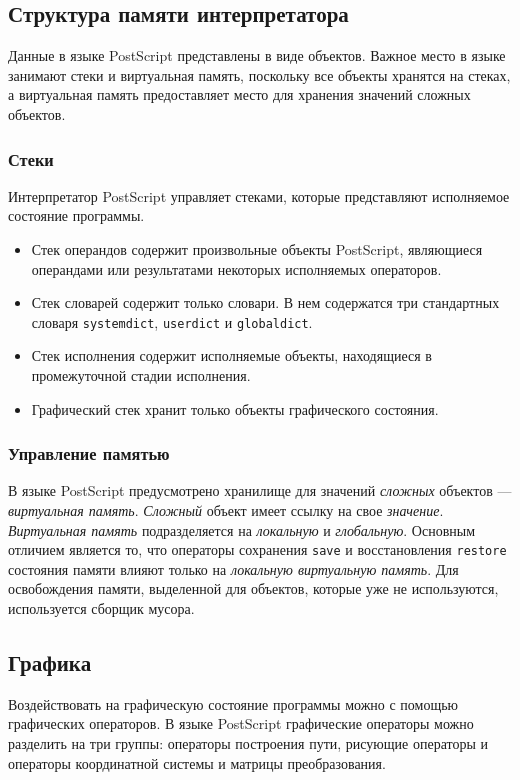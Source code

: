 \documentclass[14pt]{extarticle}
\begin{document}
\subsection{Структура памяти интерпретатора}
Данные в языке PostScript представлены в виде объектов. Важное место в языке занимают стеки и виртуальная память, поскольку все объекты хранятся на стеках, а виртуальная память предоставляет место для хранения значений сложных объектов.
\subsubsection{Стеки }
Интерпретатор PostScript управляет стеками, которые представляют исполняемое состояние программы. 
\begin{itemize}
\item Стек операндов содержит произвольные объекты PostScript, являющиеся операндами или результатами некоторых исполняемых операторов.
\item Стек словарей содержит только словари. В нем содержатся три стандартных словаря \texttt{systemdict}, \texttt{userdict} и \texttt{globaldict}.
\item Стек исполнения содержит исполняемые объекты, находящиеся в промежуточной стадии исполнения.
\item Графический стек хранит только объекты графического состояния.
\end{itemize}

\subsubsection{Управление памятью}
В языке PostScript предусмотрено хранилище для значений \textit{сложных} объектов --- \textit{виртуальная память}. \textit{Сложный} объект имеет ссылку на свое \textit{значение}. \textit{Виртуальная память} подразделяется на \textit{локальную} и \textit{глобальную}.
Основным отличием является то, что операторы сохранения \texttt{save} и восстановления \texttt{restore} состояния памяти влияют только на \textit{локальную виртуальную память}. 
Для освобождения памяти, выделенной для объектов, которые уже не используются, используется сборщик мусора. 

\subsection{Графика}
Воздействовать на графическую состояние программы можно с помощью графических операторов. В языке PostScript графические операторы можно разделить на три группы: операторы построения пути, рисующие операторы и операторы координатной системы и матрицы преобразования.
\end{document}
